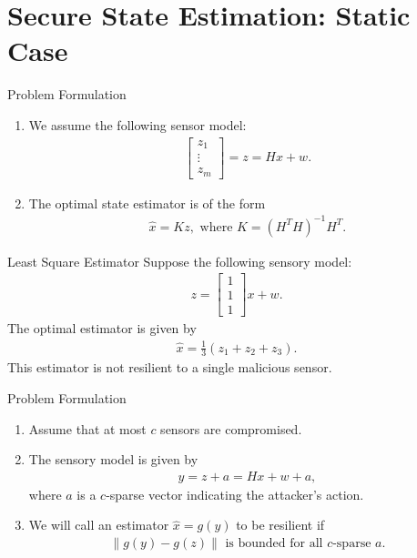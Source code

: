 \documentclass[10pt]{beamer}
\begin{document}
\section{Secure State Estimation: Static Case}

\begin{frame}{Problem Formulation}
  \begin{enumerate}
    \item We assume the following sensor model:
      \begin{align*}
	\begin{bmatrix}z_1\\\vdots\\z_m\end{bmatrix} =  z = Hx + w.
      \end{align*}
    \item The optimal state estimator is of the form
      \begin{align*}
	\hat x = Kz, \text{ where }K = (H^TH)^{-1}H^T.
      \end{align*}
  \end{enumerate}
\end{frame}

\begin{frame}{Least Square Estimator}
  Suppose the following sensory model:
  \begin{align*}
    z = \begin{bmatrix}
      1\\
      1\\
      1
    \end{bmatrix}x + w.
  \end{align*}
  The optimal estimator is given by
  \begin{align*}
    \hat x = \frac{1}{3}\left(z_1+z_2+z_3\right).
  \end{align*}
  This estimator is not resilient to a single malicious sensor.
\end{frame}

\begin{frame}{Problem Formulation}
  \begin{enumerate}
    \item Assume that at most $c$ sensors are compromised.
    \item The sensory model is given by
      \begin{align*}
	y = z + a = Hx + w +a,
      \end{align*}
      where $a$ is a $c$-sparse vector indicating the attacker's action.
    \item We will call an estimator $\hat x = g(y)$ to be resilient if
      \begin{align*}
	\|g(y) - g(z)\|\text{ is bounded for all $c$-sparse $a$}.
      \end{align*}
  \end{enumerate}
\end{frame}
\end{document}
